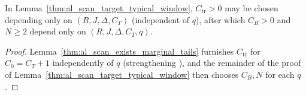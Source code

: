 \begin{lemma}
    \label{thm:al_scan_target_typical_window_uniform_dimension}
    \leanok
    In Lemma~\ref{thm:al_scan_target_typical_window}, $C_{\mathrm{tr}}>0$ may
    be chosen depending only on $(R,J,\Delta,C_T)$ (independent of $q$), after
    which $C_B>0$ and $N\ge2$ depend only on $(R,J,\Delta,C_T,q)$.
\end{lemma}
\begin{proof}\leanok
    Lemma~\ref{thm:al_scan_exists_marginal_tails} furnishes $C_{\mathrm{tr}}$
    for $C_0=C_T+1$ independently of $q$ (strengthening
    \cite[Proposition~4.5]{OpenAI2026AreaLaw}), and the remainder of the proof
    of Lemma~\ref{thm:al_scan_target_typical_window} then chooses $C_B,N$ for
    each $q$.
\end{proof}

